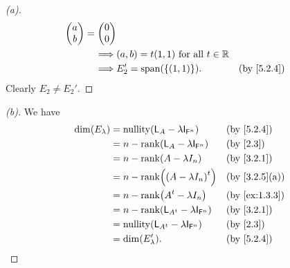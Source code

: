 \begin{proof}[(a)]
\begin{align*}
\begin{pmatrix}
                                               a \\
                                               b
                                             \end{pmatrix} = \begin{pmatrix}
                                                               0 \\
                                                               0
                                                             \end{pmatrix}             \\
    \implies & (a, b) = t(1, 1) \text{ for all } t \in \R                               \\
    \implies & E_2' = \spn{\set{(1, 1)}}.                 &  & \text{(by \cref{5.2.4})}
  \end{align*}
  Clearly \(E_2 \neq E_2'\).
\end{proof}

\begin{proof}[(b)]
  We have
  \begin{align*}
    \dim(E_{\lambda}) & = \nt{\L_A - \lambda \IT[\vs{F}^n]}            &  & \text{(by \cref{5.2.4})}    \\
                      & = n - \rk{\L_A - \lambda \IT[\vs{F}^n]}        &  & \text{(by \cref{2.3})}      \\
                      & = n - \rk{A - \lambda I_n}                     &  & \text{(by \cref{3.2.1})}    \\
                      & = n - \rk{\tp{(A - \lambda I_n)}}              &  & \text{(by \cref{3.2.5}(a))} \\
                      & = n - \rk{\tp{A} - \lambda I_n}                &  & \text{(by \cref{ex:1.3.3})} \\
                      & = n - \rk{\L_{\tp{A}} - \lambda \IT[\vs{F}^n]} &  & \text{(by \cref{3.2.1})}    \\
                      & = \nt{\L_{\tp{A}} - \lambda \IT[\vs{F}^n]}     &  & \text{(by \cref{2.3})}      \\
                      & = \dim(E_{\lambda}').                          &  & \text{(by \cref{5.2.4})}
  \end{align*}
\end{proof}

